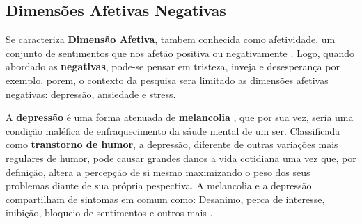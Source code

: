 \subsection{Dimensões Afetivas Negativas}
Se caracteriza \textbf{Dimensão Afetiva}, tambem conhecida como afetividade, um conjunto de sentimentos que nos afetão positiva ou negativamente \cite{pinto2009afetos}. Logo, quando abordado as \textbf{negativas}, pode-se pensar em tristeza, inveja e desesperança por exemplo, porem, o contexto da pesquisa sera limitado as dimensões afetivas negativas: depressão, ansiedade e stress.

A \textbf{depressão} é uma forma atenuada de \textbf{melancolia} \cite{roudinesco2000psicanalise}, que por sua vez, seria uma condição maléfica de enfraquecimento da sáude mental de um ser. Classificada como \textbf{transtorno de humor}, a depressão, diferente de outras variações mais regulares de humor, pode causar grandes danos a vida cotidiana uma vez que, por definição, altera a percepção de si mesmo maximizando o peso dos seus problemas diante de sua própria pespectiva. A melancolia e a depressão compartilham de sintomas em comum como: Desanimo, perca de interesse, inibição, bloqueio de sentimentos e outros mais \cite[28]{freud2014livro}.